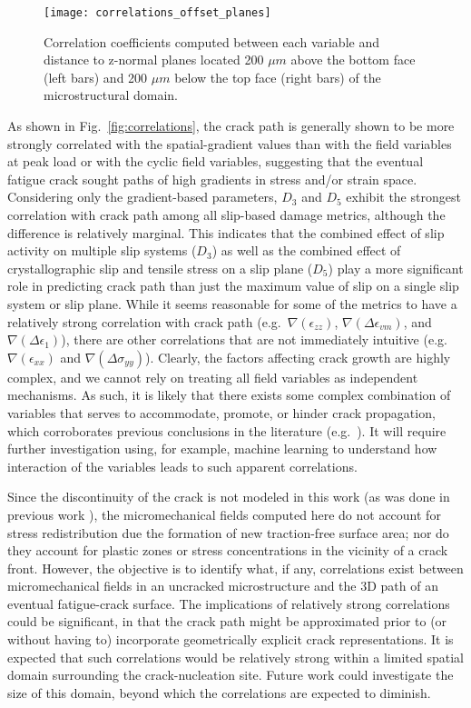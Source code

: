 \begin{figure}[p]
  \centering
    \texttt{[image: correlations\_offset\_planes]}
    \caption{Correlation coefficients computed between each variable and distance to z-normal planes located 200 $\mu m$ above the bottom face (left bars) and 200 $\mu m$ below the top face (right bars) of the microstructural domain.}
    \label{fig:correlations_offset_planes}
\end{figure}

As shown in Fig.~\ref{fig:correlations}, the crack path is generally shown to be more strongly correlated with the spatial-gradient values than with the field variables at peak load or with the cyclic field variables, suggesting that the eventual fatigue crack sought paths of high gradients in stress and/or strain space. Considering only the gradient-based parameters, $D_3$ and $D_5$ exhibit the strongest correlation with crack path among all slip-based damage metrics, although the difference is relatively marginal. This indicates that the combined effect of slip activity on multiple slip systems ($D_3$) as well as the combined effect of crystallographic slip and tensile stress on a slip plane ($D_5$) play a more significant role in predicting crack path than just the maximum value of slip on a single slip system or slip plane. While it seems reasonable for some of the metrics to have a relatively strong correlation with crack path (e.g.~$\nabla(\epsilon_{zz})$, $\nabla(\Delta\epsilon_{vm})$, and $\nabla(\Delta\epsilon_{1})$), there are other correlations that are not immediately intuitive (e.g.~$\nabla(\epsilon_{xx})$ and $\nabla(\Delta\sigma_{yy})$). Clearly, the factors affecting crack growth are highly complex, and we cannot rely on treating all field variables as independent mechanisms. As such, it is likely that there exists some complex combination of variables that serves to accommodate, promote, or hinder crack propagation, which corroborates previous conclusions in the literature (e.g.~\cite{McDowell_2010,Hochhalter_2011,Rovinelli_2017}). It will require further investigation using, for example, machine learning to understand how interaction of the variables leads to such apparent correlations. 

Since the discontinuity of the crack is not modeled in this work (as was done in previous work \cite{spear2016}), the micromechanical fields computed here do not account for stress redistribution due the formation of new traction-free surface area; nor do they account for plastic zones or stress concentrations in the vicinity of a crack front. However, the objective is to identify what, if any, correlations exist between micromechanical fields in an uncracked microstructure and the 3D path of an eventual fatigue-crack surface. The implications of relatively strong correlations could be significant, in that the crack path might be approximated prior to (or without having to) incorporate geometrically explicit crack representations. It is expected that such correlations would be relatively strong within a limited spatial domain surrounding the crack-nucleation site. Future work could investigate the size of this domain, beyond which the correlations are expected to diminish. 

